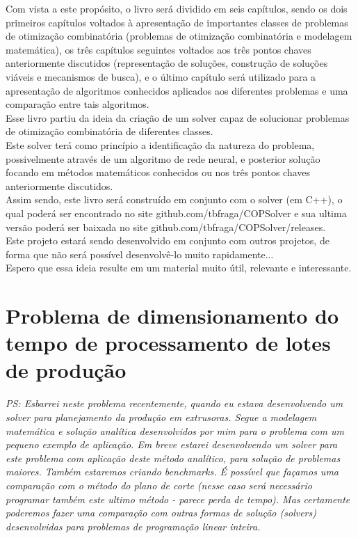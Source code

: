\documentclass{book}
\begin{document}
Com vista a este propósito, o livro será dividido em seis capítulos, sendo os dois primeiros capítulos voltados à apresentação de importantes classes de problemas de otimização combinatória (problemas de otimização combinatória e modelagem matemática), os três capítulos seguintes voltados aos três pontos chaves anteriormente discutidos (representação de soluções, construção de soluções viáveis e mecanismos de busca), e o último capítulo será utilizado para a apresentação de algoritmos conhecidos aplicados aos diferentes problemas e uma comparação entre tais algoritmos. \\

Esse livro partiu da ideia da criação de um solver capaz de solucionar problemas de otimização combinatória de diferentes classes. \\

Este solver terá como princípio a identificação da natureza do problema, possivelmente através de um algoritmo de rede neural, e posterior solução focando em métodos matemáticos conhecidos ou nos três pontos chaves anteriormente discutidos. \\

Assim sendo, este livro será construído em conjunto com o solver (em C++), o qual poderá ser encontrado no site github.com/tbfraga/COPSolver e sua ultima versão poderá ser baixada no site github.com/tbfraga/COPSolver/releases. \\

Este projeto estará sendo desenvolvido em conjunto com outros projetos, de forma que não será possível desenvolvê-lo muito rapidamente... \\

Espero que essa ideia resulte em um material muito útil, relevante e interessante.

\section{Problema de dimensionamento do tempo de processamento de lotes de produção}

\emph{PS: Esbarrei neste problema recentemente, quando eu estava desenvolvendo um solver para planejamento da produção em extrusoras. Segue a modelagem matemática e solução analítica desenvolvidos por mim para o problema com um pequeno exemplo de aplicação. Em breve estarei desenvolvendo um solver para este problema com aplicação deste método analítico, para solução de problemas maiores. Também estaremos criando benchmarks. É possível que façamos uma comparação com o método do plano de corte (nesse caso será necessário programar também este ultimo método - parece perda de tempo). Mas certamente poderemos fazer uma comparação com outras formas de solução (solvers) desenvolvidas para problemas de programação linear inteira.} \\
\end{document}
